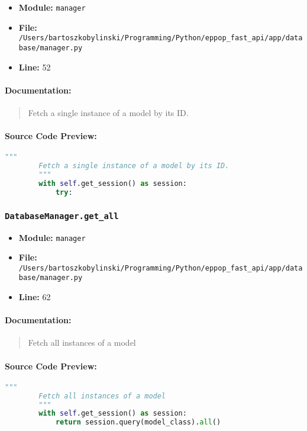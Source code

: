 \documentclass[11pt,a4paper]{article}
\begin{document}
\begin{itemize}
    \item \textbf{Module:} \texttt{manager}
    \item \textbf{File:} \texttt{/Users/bartoszkobylinski/Programming/Python/eppop\_fast\_api/app/database/manager.py}
    \item \textbf{Line:} 52
\end{itemize}

\paragraph{Documentation:}
\begin{quote}
Fetch a single instance of a model by its ID.
\end{quote}

\paragraph{Source Code Preview:}
\begin{lstlisting}[language=Python]
        """
        Fetch a single instance of a model by its ID.
        """
        with self.get_session() as session:
            try:
\end{lstlisting}

\vspace{1em}
\subsubsection{\texttt{DatabaseManager.get\_all}}

\begin{itemize}
    \item \textbf{Module:} \texttt{manager}
    \item \textbf{File:} \texttt{/Users/bartoszkobylinski/Programming/Python/eppop\_fast\_api/app/database/manager.py}
    \item \textbf{Line:} 62
\end{itemize}

\paragraph{Documentation:}
\begin{quote}
Fetch all instances of a model
\end{quote}

\paragraph{Source Code Preview:}
\begin{lstlisting}[language=Python]
        """
        Fetch all instances of a model
        """
        with self.get_session() as session:
            return session.query(model_class).all()
\end{lstlisting}
\end{document}
